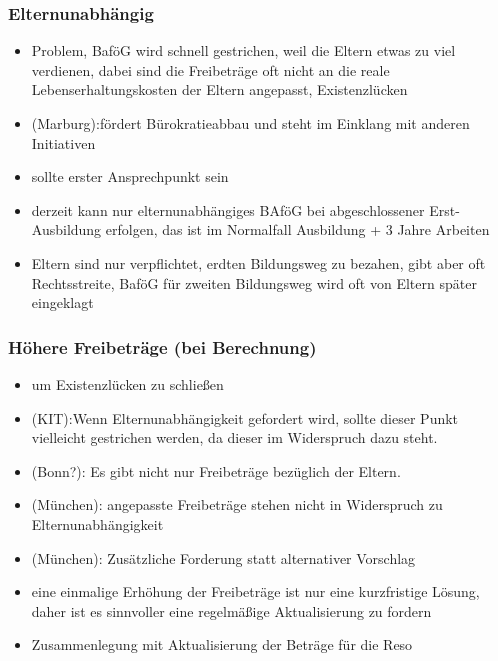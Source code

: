     \subsubsection*{Elternunabhängig}
      \begin{itemize}
        \item Problem, BaföG wird schnell gestrichen, weil die Eltern etwas zu viel verdienen, dabei sind die Freibeträge oft nicht an die reale Lebenserhaltungskosten der Eltern angepasst, Existenzlücken
        \item (Marburg):fördert Bürokratieabbau und steht im Einklang mit anderen Initiativen
        \item sollte erster Ansprechpunkt sein
        \item derzeit kann nur elternunabhängiges BAföG bei abgeschlossener Erst-Ausbildung erfolgen, das ist im Normalfall Ausbildung + 3 Jahre Arbeiten
        \item Eltern sind nur verpflichtet, erdten Bildungsweg zu bezahen, gibt aber oft Rechtsstreite, BaföG für zweiten Bildungsweg wird oft von Eltern später eingeklagt
      \end{itemize}

    \subsubsection*{Höhere Freibeträge (bei Berechnung)}
      \begin{itemize}
        \item um Existenzlücken zu schließen
        \item (KIT):Wenn Elternunabhängigkeit gefordert wird, sollte dieser Punkt vielleicht gestrichen werden, da dieser im Widerspruch dazu steht.
        \item (Bonn?): Es gibt nicht nur Freibeträge bezüglich der Eltern.
        \item (München): angepasste Freibeträge stehen nicht in Widerspruch zu Elternunabhängigkeit
        \item (München): Zusätzliche Forderung statt alternativer Vorschlag
        \item eine einmalige Erhöhung der Freibeträge ist nur eine kurzfristige Lösung, daher ist es sinnvoller eine regelmäßige Aktualisierung zu fordern
        \item Zusammenlegung mit Aktualisierung der Beträge für die Reso
      \end{itemize}

